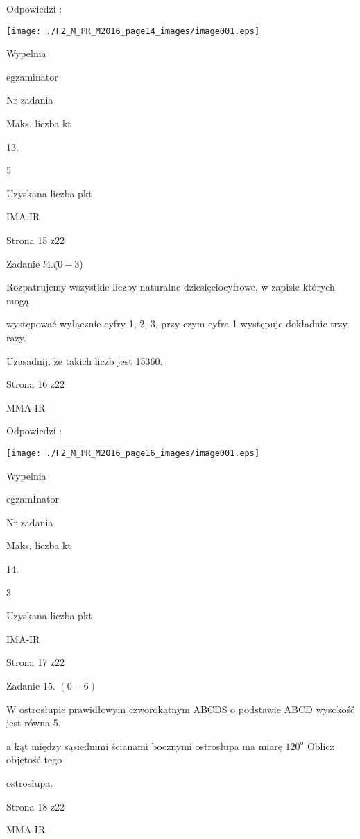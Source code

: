 \documentclass[a4paper,12pt]{article}
\begin{document}
Odpowiedzí :
\begin{center}
\texttt{[image: ./F2\_M\_PR\_M2016\_page14\_images/image001.eps]}
\end{center}
Wypelnia

egzaminator

Nr zadania

Maks. liczba kt

13.

5

Uzyskana liczba pkt

IMA-IR

Strona 15 z22





Zadanie $l4. \zeta 0-3$)

Rozpatrujemy wszystkie liczby naturalne dziesięciocyfrowe, w zapisie których mogą

występować wyłącznie cyfry 1, 2, 3, przy czym cyfra 1 występuje dokładnie trzy razy.

Uzasadnij, $\dot{\mathrm{z}}\mathrm{e}$ takich liczb jest 15360.

Strona 16 z22

MMA-IR





Odpowiedzí :
\begin{center}
\texttt{[image: ./F2\_M\_PR\_M2016\_page16\_images/image001.eps]}
\end{center}
Wypelnia

egzamÍnator

Nr zadania

Maks. liczba kt

14.

3

Uzyskana liczba pkt

IMA-IR

Strona 17 z22





Zadanie 15. $(0-6)$

$\mathrm{W}$ ostrosłupie prawidłowym czworokątnym ABCDS o podstawie ABCD wysokość jest równa 5,

a kąt między sąsiednimi ścianami bocznymi ostrosłupa ma miarę $120^{\mathrm{o}}$ Oblicz objętość tego

ostrosłupa.

Strona 18 z22

MMA-IR
\end{document}
